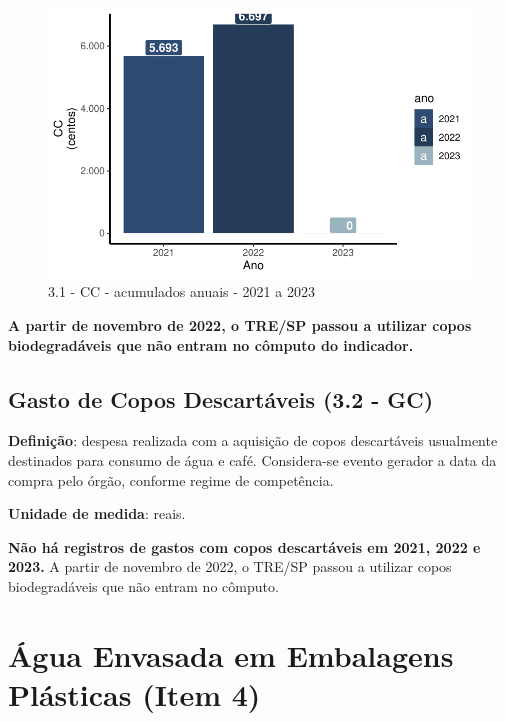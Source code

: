 \documentclass[
  a4paper,
  DIV=11,
  numbers=noendperiod]{scrartcl}
\begin{document}
\begin{figure}[H]

{\centering \includegraphics{relatorio_2023_files/figure-pdf/fig-gccac-1.pdf}

}

\caption{\label{fig-gccac}3.1 - CC - acumulados anuais - 2021 a 2023}

\end{figure}

\textbf{A partir de novembro de 2022, o TRE/SP passou a utilizar copos
biodegradáveis que não entram no cômputo do indicador.}

\hypertarget{gasto-de-copos-descartuxe1veis-3.2---gc}{%
\subsection{Gasto de Copos Descartáveis (3.2 -
GC)}\label{gasto-de-copos-descartuxe1veis-3.2---gc}}

\textbf{Definição}: despesa realizada com a aquisição de copos
descartáveis usualmente destinados para consumo de água e café.
Considera-se evento gerador a data da compra pelo órgão, conforme regime
de competência.

\textbf{Unidade de medida}: reais.

\textbf{Não há registros de gastos com copos descartáveis em 2021, 2022
e 2023.} A partir de novembro de 2022, o TRE/SP passou a utilizar copos
biodegradáveis que não entram no cômputo.

\newpage

\hypertarget{uxe1gua-envasada-em-embalagens-pluxe1sticas-item-4}{%
\section{Água Envasada em Embalagens Plásticas (Item
4)}\label{uxe1gua-envasada-em-embalagens-pluxe1sticas-item-4}}
\end{document}
